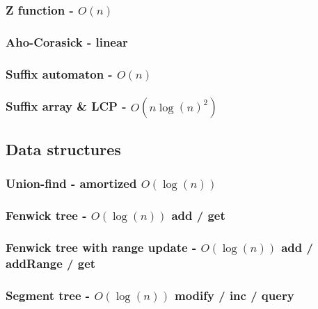 \documentclass[landscape,a4paper,twocolumn,10pt]{report}
\begin{document}
\subsubsection{Z function - $O(n)$}


\subsubsection{Aho-Corasick - linear}


\subsubsection{Suffix automaton - $O(n)$}


\subsubsection{Suffix array \& LCP - $O(n \log(n)^2)$}


\subsection*{Data structures}
\label{datastruct}

\subsubsection{Union-find - amortized $O(\log(n))$}


\subsubsection{Fenwick tree - $O(\log(n))$ add / get}


\subsubsection{Fenwick tree with range update - $O(\log(n))$ add / addRange / get}


\subsubsection{Segment tree - $O(\log(n))$ modify / inc / query}

\end{document}
